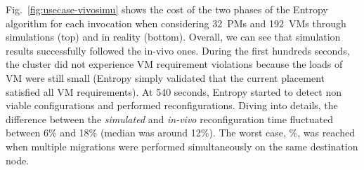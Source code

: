 Fig.~\ref{fig:usecase-vivosimu} shows the cost of the two phases of
the Entropy algorithm for each invocation when considering 32~PMs and
192~VMs through simulations (top) and in reality (bottom). Overall, we can see that simulation results successfully
followed the in-vivo ones. During the first hundreds seconds, the cluster did not
experience VM requirement violations because the loads of VM were
still small (\ie Entropy simply validated that the current placement
satisfied all VM requirements). At 540 seconds, Entropy started to
detect non viable configurations and performed reconfigurations.
Diving into details, the difference between the \textit{simulated} and
\textit{in-vivo} reconfiguration time fluctuated between 6\% and 18\%
(median was around 12\%). %
The worst case, \%, was reached when
multiple migrations were performed simultaneously on the same
destination node.
